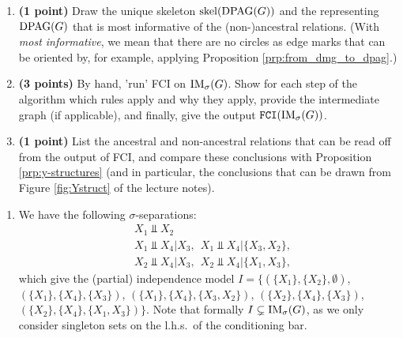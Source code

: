 \begin{enumerate}
\begin{enumerate}
 	\emph{Hint: instead of checking this for all graphs individually, you can use exercise (a) and Proposition \ref*{prp:sigma-inducing_path_properties}}
	\item \textbf{(1 point)} Draw the unique skeleton $\mathrm{skel}(\mathrm{DPAG}(G))$ and the representing $\mathrm{DPAG}(G)$ that is most informative of the (non-)ancestral relations. (With \emph{most informative}, we mean that there are no circles as edge marks that can be oriented by, for example, applying Proposition \ref*{prp:from_dmg_to_dpag}.)
	\item \textbf{(3 points)} By hand, 'run' FCI on $\mathrm{IM}_\sigma(G)$. Show for each step of the algorithm which rules apply and why they apply, provide the intermediate graph (if applicable), and finally, give the output $\mathtt{FCI}(\mathrm{IM}_\sigma(G))$.
	\item \textbf{(1 point)} List the ancestral and non-ancestral relations that can be read off from the output of FCI, and compare these conclusions with Proposition \ref*{prp:y-structures} (and in particular, the conclusions that can be drawn from Figure \ref*{fig:Ystruct} of the lecture notes).
\end{enumerate}
\begin{gradedsolution}
	\begin{enumerate}
		\item We have the following $\sigma$-separations:
		\begin{align*}
			&X_1 \Perp X_2 \\
			&X_1\Perp X_4|X_3, ~~ X_1\Perp X_4|\{X_3, X_2\}, \\
			&X_2\Perp X_4|X_3, ~~ X_2\Perp X_4|\{X_1, X_3\},
		\end{align*}
		which give the (partial) independence model $I = \{(\{X_1\}, \{X_2\}, \emptyset)$, $(\{X_1\}, \{X_4\}, \{X_3\})$, $(\{X_1\}, \{X_4\}, \{X_3, X_2\})$, $(\{X_2\}, \{X_4\}, \{X_3\})$, $(\{X_2\}, \{X_4\}, \{X_1, X_3\})\}$. Note that formally $I\subsetneq \mathrm{IM}_\sigma(G)$, as we only consider singleton sets on the l.h.s.\ of the conditioning bar.

\end{enumerate}
\end{gradedsolution}
\end{enumerate}

